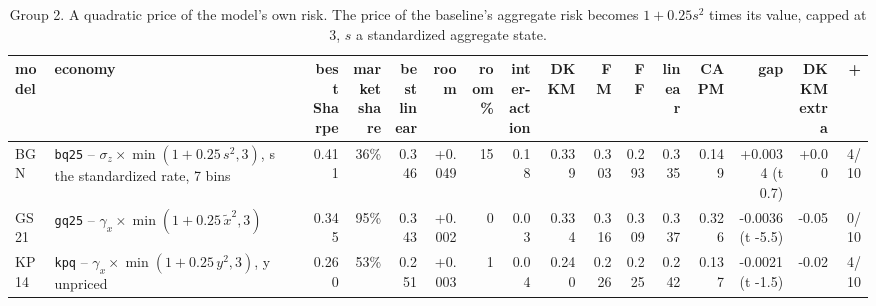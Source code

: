 \begin{table}[htbp]\centering\footnotesize\setlength{\tabcolsep}{2pt}
\caption{Group 2. A quadratic price of the model's own risk. The price of the baseline's aggregate risk becomes $1 + 0.25 s^2$ times its value, capped at 3, $s$ a standardized aggregate state.}\label{tab:g2}
\begin{adjustbox}{max width=\textwidth}\begin{tabular}{l>{\raggedright\arraybackslash}p{3.6cm}rrrrrrrrrrrrrr}\hline
model & economy & \shortstack[r]{best\\Sharpe} & \shortstack[r]{market\\share} & \shortstack[r]{best\\linear} & room & \shortstack[r]{room\\\%} & \shortstack[r]{inter-\\action} & DKKM & FM & FF & linear & CAPM & gap & \shortstack[r]{DKKM\\extra} & + \\\hline
BGN & \texttt{bq25} -- $\sigma_z \times \min(1 + 0.25\,s^2, 3)$, s the standardized rate, 7 bins & 0.411 & 36\% & 0.346 & +0.049 & 15 & 0.18 & 0.339 & 0.303 & 0.293 & 0.335 & 0.149 & +0.0034 (t 0.7) & +0.00 & 4/10 \\
GS21 & \texttt{gq25} -- $\gamma_x \times \min(1 + 0.25\,\tilde x^2, 3)$ & 0.345 & 95\% & 0.343 & +0.002 & 0 & 0.03 & 0.334 & 0.316 & 0.309 & 0.337 & 0.326 & -0.0036 (t -5.5) & -0.05 & 0/10 \\
KP14 & \texttt{kpq} -- $\gamma_x \times \min(1 + 0.25\,y^2, 3)$, y unpriced & 0.260 & 53\% & 0.251 & +0.003 & 1 & 0.04 & 0.240 & 0.226 & 0.225 & 0.242 & 0.137 & -0.0021 (t -1.5) & -0.02 & 4/10 \\
\hline\end{tabular}\end{adjustbox}\end{table}

